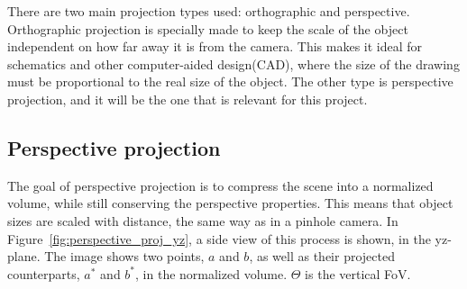 There are two main projection types used: orthographic and perspective. Orthographic projection is specially made to keep the scale of the object independent on how far away it is from the camera. This makes it ideal for schematics and other computer-aided design(CAD), where the size of the drawing must be proportional to the real size of the object. The other type is perspective projection, and it will be the one that is relevant for this project.

\subsection{Perspective projection}

The goal of perspective projection is to compress the scene into a normalized volume, while still conserving the perspective properties. This means that object sizes are scaled with distance, the same way as in a pinhole camera. In Figure~\ref{fig:perspective_proj_yz}, a side view of this process is shown, in the yz-plane. The image shows two points, $a$ and $b$, as well as their projected counterparts, $a^*$ and $b^*$, in the normalized volume. $\Theta$ is the vertical FoV.

